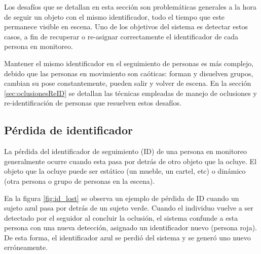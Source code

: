 Los desafíos que se detallan en esta sección son problemáticas generales a la hora de seguir un objeto con el mismo identificador, todo el tiempo que este permanece visible en escena. Uno de los objetivos del sistema es detectar estos casos, a fin de recuperar o re-asignar correctamente el identificador de cada persona en monitoreo. 

Mantener el mismo identificador en el seguimiento de personas es más complejo, debido que las personas en movimiento son caóticas: forman y disuelven grupos, cambian su pose constantemente, pueden salir y volver de escena. En la sección \ref{sec:oclusionesReID} se detallan las técnicas empleadas de manejo de oclusiones y re-identificación de personas que resuelven estos desafíos.

\subsection{Pérdida de identificador}

La pérdida del identificador de seguimiento (ID) de una persona en monitoreo generalmente ocurre cuando esta pasa por detrás de otro objeto que la ocluye. El objeto que la ocluye puede ser estático (un mueble, un cartel, etc) o dinámico (otra persona o grupo de personas en la escena).

En la figura \ref{fig:id_lost} se observa un ejemplo de pérdida de ID cuando un sujeto azul pasa por detrás de un sujeto verde. Cuando el individuo vuelve a ser detectado por el seguidor al concluir la oclusión, el sistema confunde a esta persona con una nueva detección, asignado un identificador nuevo (persona roja). De esta forma, el identificador azul se perdió del sistema y se generó uno nuevo erróneamente.

